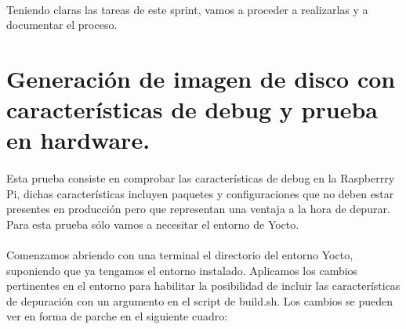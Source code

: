 \paragraph{}Teniendo claras las tareas de este sprint, vamos a proceder a realizarlas
y a documentar el proceso.

\section{Generación de imagen de disco con características de debug y prueba en hardware.}

\paragraph{}Esta prueba consiste en comprobar las características de debug en la
Raspberrry Pi, dichas características incluyen paquetes y configuraciones que no deben
estar presentes en producción pero que representan una ventaja a la hora de depurar.
Para esta prueba sólo vamos a necesitar el entorno de Yocto.

\paragraph{}Comenzamos abriendo con una terminal el directorio del entorno Yocto,
suponiendo que ya tengamos el entorno instalado. Aplicamos los cambios pertinentes
en el entorno para habilitar la posibilidad de incluir las características de depuración
con un argumento en el script de build.sh. Los cambios se pueden ver en forma de parche
en el siguiente cuadro:

